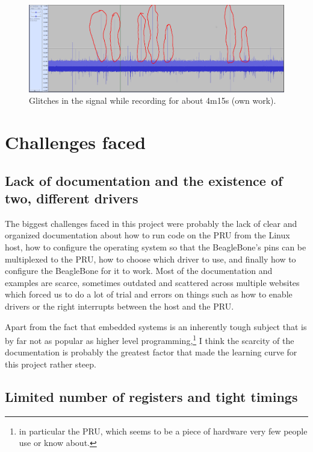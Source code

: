 \documentclass[]{report}
\begin{document}
\begin{figure}[H]
\centering
\includegraphics[width=0.8\linewidth]{Pictures/glitches_circled.png}
\caption{Glitches in the signal while recording for about 4m15s (own work).}
\end{figure}

\hypertarget{challenges-faced}{%
\chapter{Challenges faced}\label{challenges-faced}}

\hypertarget{lack-of-documentation-and-the-existence-of-2-different-drivers}{%
\section{Lack of documentation and the existence of two, different
drivers}\label{lack-of-documentation-and-the-existence-of-2-different-drivers}}

The biggest challenges faced in this project were probably the lack of clear and organized documentation about how to run code on the PRU from the Linux host, how to configure the operating system so that the BeagleBone's pins can be multiplexed to the PRU, how to choose which driver to use, and finally how to configure the BeagleBone for it to work. Most of the documentation and examples are scarce, sometimes outdated and scattered across multiple websites which forced us to do a lot of trial and errors on things such as how to enable drivers or the right interrupts between the host and the PRU.

Apart from the fact that embedded systems is an inherently tough subject that is by far not as popular as higher level programming,\footnote{in particular the PRU, which seems to be a piece of hardware very few people use or know about.} I think the scarcity of the documentation is probably the greatest factor that made the learning curve for this project rather steep.

\hypertarget{limited-number-of-registers-and-tight-timings}{%
\section{Limited number of registers and tight
timings}\label{limited-number-of-registers-and-tight-timings}}
\end{document}

